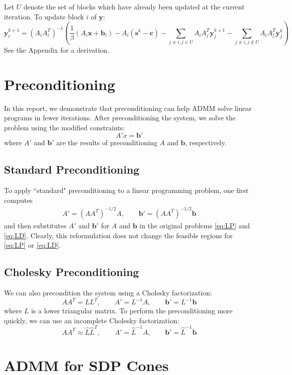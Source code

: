 \documentclass{article}
\begin{document}
Let $U$ denote the set of blocks which have already been updated at the current iteration. To update block $i$ of $\mathbf{y}$:
\[
\mathbf{y}_{i}^{k+1}=\left(A_{i}A_{i}^{T}\right)^{-1}\left(\frac{1}{\beta}\left(A_{i}\mathbf{x}+\mathbf{b}_{i}\right)-A_{i}\left(\mathbf{s}^{k}-\mathbf{c}\right)-\sum_{j\neq i,j\in U}A_{i}A_{j}^{T}\mathbf{y}_{j}^{k+1}-\sum_{j\neq i,j\notin U}A_{i}A_{j}^{T}\mathbf{y}_{j}^{k}\right)
\]
See the Appendix for a derivation.

\section{Preconditioning}
In this report, we demonstrate that preconditioning can help ADMM solve linear programs in fewer iterations. After preconditioning the system, we solve the problem using the modified constraints: 
\begin{equation}
A' x = \mathbf{b}'
\end{equation}
where $A'$ and $\mathbf{b}'$ are the results of preconditioning $A$ and $\mathbf{b}$, respectively.
\subsection*{Standard Preconditioning}
To apply ``standard" preconditioning to a linear programming problem, one first computes 
\begin{align}
A' = (AA^T )^{-1/2}A , \quad \quad \mathbf{b}' =(AA^T )^{-1/2}\mathbf{b}
\end{align}
and then substitutes $A'$ and $\mathbf{b}'$ for $A$ and $\mathbf{b}$ in the original problems \eqref{eq:LP} and \eqref{eq:LD}. Clearly, this reformulation does not change the feasible regions for  \eqref{eq:LP} or \eqref{eq:LD}. 

\subsection*{Cholesky Preconditioning}
We  can also precondition the system using a Cholesky factorization:
\[
AA^{T}=LL^{T}, \quad \quad A'=L^{-1}A, \quad \quad \mathbf{b}'=L^{-1}\mathbf{b}
\]
where $L$ is a lower triangular matrix. To perform the preconditioning more quickly, we can use an incomplete Cholesky factorization:
\[
AA^{T} \approx \hat{L}\hat{L}^{T}, \quad \quad A'=\hat{L}^{-1}A, \quad \quad \mathbf{b}'=\hat{L}^{-1}\mathbf{b}
\]

\section{ADMM for SDP Cones}
\end{document}

